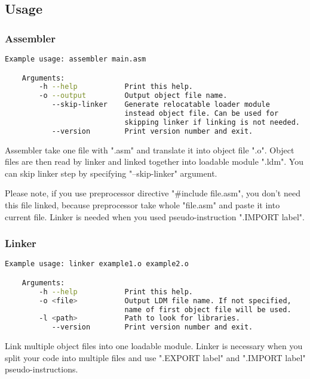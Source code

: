 \subsection{Usage}

\subsubsection{Assembler}

\begin{lstlisting}[language=bash, frame=single]
    Example usage: assembler main.asm

    Arguments:
        -h --help           Print this help.
        -o --output         Output object file name.
           --skip-linker    Generate relocatable loader module
                            instead object file. Can be used for
                            skipping linker if linking is not needed.
           --version        Print version number and exit.
\end{lstlisting}

Assembler take one file with ".asm" and translate it into object file ".o".
Object files are then read by linker and linked together into loadable module
".ldm". You can skip linker step by specifying "--skip-linker" argument.

Please note, if you use preprocessor directive "\#include file.asm", you don't
need this file linked, because preprocessor take whole "file.asm" and paste it
into current file. Linker is needed when you used pseudo-instruction ".IMPORT
label".

\subsubsection{Linker}

\begin{lstlisting}[language=bash, frame=single]
    Example usage: linker example1.o example2.o

    Arguments:
        -h --help           Print this help.
        -o <file>           Output LDM file name. If not specified,
                            name of first object file will be used.
        -l <path>           Path to look for libraries.
           --version        Print version number and exit.
\end{lstlisting}

Link multiple object files into one loadable module. Linker is necessary when
you split your code into multiple files and use ".EXPORT label" and ".IMPORT
label" pseudo-instructions.

